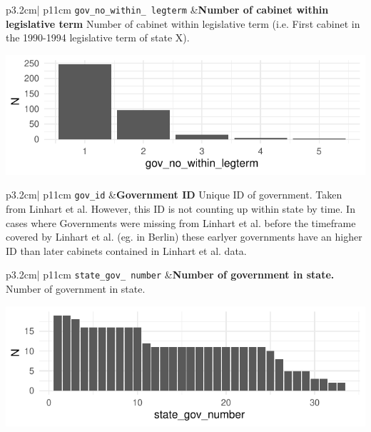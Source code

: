 \documentclass[
]{article}
\begin{document}
\begin{longtable}{p{3.2cm}| p{11cm}}
\texttt{gov\_no\_within\_
legterm} &\textbf{Number of cabinet within legislative term}\newline 
Number of cabinet within legislative term (i.e. First cabinet in the 1990-1994 legislative term of state X).



\hspace*{.25cm}
\begin{minipage}[t]{\linewidth }
\vspace{0pt}
\includegraphics[width = \linewidth]{cbgov/govnolegperplot.pdf}
\end{minipage}



\end{longtable}

\begin{longtable}{p{3.2cm}| p{11cm}}
\texttt{gov\_id} &\textbf{Government ID}\newline 
Unique ID of government. Taken from Linhart et al. However, this ID is not counting up within state by time. In cases where Governments were 
           missing from Linhart et al. before the timeframe covered by Linhart et al. (eg. in Berlin) these earlyer governments have an higher ID than later cabinets 
           contained in Linhart et al. data.
\end{longtable}

\begin{longtable}{p{3.2cm}| p{11cm}}
\texttt{state\_gov\_
number} &\textbf{Number of government in state.}\newline 
Number of government in state.



\hspace*{.25cm}
\begin{minipage}[t]{\linewidth }
\vspace{0pt}
\includegraphics[width = \linewidth]{cbgov/stategovnumplot.pdf}
\end{minipage}



\end{longtable}
\end{document}
